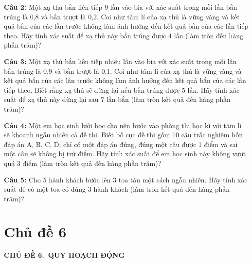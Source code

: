 \documentclass[12pt, a4paper]{article}
\begin{document}
		\vspace{0.5cm}
		
		\noindent \textbf{Câu 2:} Một xạ thủ bắn liên tiếp 9 lần vào bia với xác suất trong mỗi lần bắn trúng là 0,8 và bắn trượt là 0,2. Coi như tâm lí của xạ thủ là vững vàng và kết quả bắn của các lần trước không làm ảnh hưởng đến kết quả bắn của các lần tiếp theo. Hãy tính xác suất để xạ thủ này bắn trúng được 4 lần (làm tròn đến hàng phần trăm)?
		\hfill {}
		
		\vspace{0.5cm}
	
		\noindent \textbf{Câu 3:} Một xạ thủ bắn liên tiếp nhiều lần vào bia với xác suất trong mỗi lần bắn trúng là 0,9 và bắn trượt là 0,1. Coi như tâm lí của xạ thủ là vững vàng và kết quả bắn của các lần trước không làm ảnh hưởng đến kết quả bắn của các lần tiếp theo. Biết rằng xạ thủ sẽ dừng lại nếu bắn trúng được 5 lần. Hãy tính xác suất để xạ thủ này dừng lại sau 7 lần bắn (làm tròn kết quả đến hàng phần trăm)?
		\hfill {}
		\vspace{0.5cm}
		
		\noindent \textbf{Câu 4:} Một em học sinh lười học cho nên bước vào phòng thi học kì với tâm lí sẽ khoanh ngẫu nhiên cả đề thi. Biết bố cục đề thi gồm 10 câu trắc nghiệm bốn đáp án A, B, C, D; chỉ có một đáp án đúng, đúng một câu được 1 điểm và sai một câu sẽ không bị trừ điểm. Hãy tính xác suất để em học sinh này không vượt quá 3 điểm (làm tròn kết quả đến hàng phần trăm)?
		\hfill {}
		
		\vspace{0.5cm}
		
		\noindent \textbf{Câu 5:} Cho 5 hành khách bước lên 3 toa tàu một cách ngẫu nhiên. Hãy tính xác suất để có một toa có đúng 3 hành khách (làm tròn kết quả đến hàng phần trăm)?
		\hfill {}
		\newpage
	\section*{Chủ đề 6}
	\begin{tcolorbox}[colback=headerbg, colframe=headerborder, arc=3mm, boxrule=1.5pt, halign=center]
		\textbf{\Large CHỦ ĐỀ 6.\ QUY HOẠCH ĐỘNG}
	\end{tcolorbox}
		
\end{document}
